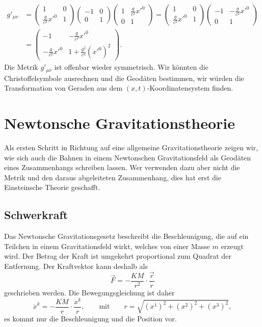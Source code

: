 \begin{align*}
g'_{\mu\nu}
&=
\begin{pmatrix}
1&0\\
\frac{g}{c^2}x'^0&1
\end{pmatrix}
\begin{pmatrix}
-1&0\\0&1
\end{pmatrix}
\begin{pmatrix}
1&\frac{g}{c^2}x'^0\\
0&1
\end{pmatrix}
=
\begin{pmatrix}
1&0\\
\frac{g}{c^2}x'^0&1
\end{pmatrix}
\begin{pmatrix}
-1&-\frac{g}{c^2}x'^0\\
 0& 1
\end{pmatrix}
\\
&=
\begin{pmatrix}
-1&-\frac{g}{c^2}x'^0\\
-\frac{g}{c^2}x'^0&1+\frac{g^2}{c^4}(x'^0)^2
\end{pmatrix}.
\end{align*}
Die Metrik $g'_{\mu\nu}$ ist offenbar wieder symmetrisch.
Wir könnten die Christoffelsymbole ausrechnen und die Geodäten
bestimmen, wir würden die Transformation von Geraden aus dem
$(x,t)$-Koordinaten\-system finden.

\section{Newtonsche Gravitationstheorie%
\label{skript:section:newtonschegravitationstheorie}}
Als ersten Schritt in Richtung auf eine allgemeine Gravitationstheorie
zeigen wir, wie sich auch die Bahnen in einem Newtonschen Gravitationsfeld 
als Geodäten eines Zusammenhangs schreiben lassen.
Wer verwenden dazu aber nicht die Metrik und den daraus abgeleiteten 
Zusammenhang, dies hat erst die Einsteinsche Theorie geschafft.

\subsection{Schwerkraft}
Das Newtonsche Gravitationsgesetz beschreibt die Beschleunigung, die
auf ein Teilchen in einem Gravitationsfeld wirkt, welches von einer
Masse $m$ erzeugt wird.
Der Betrag der Kraft ist umgekehrt proportional zum Quadrat der
Entfernung.
Der Kraftvektor kann deshalb als
\begin{equation}
\vec F = -\frac{KM}{r^2}\cdot\frac{\vec r}{r}
\label{skript:gravitation:gkraft}
\end{equation}
geschrieben werden.
Die Bewegungsgleichung ist daher 
\begin{equation}
\ddot x^k = -\frac{KM}{r}\cdot\frac{x^k}{r},
\qquad\text{mit}\qquad r = \sqrt{(x^1)^2+(x^2)^2+(x^3)^2},
\label{skript:gravitation:bewegungsgleichung}
\end{equation}
es kommt nur die Beschleunigung und die Position vor.

